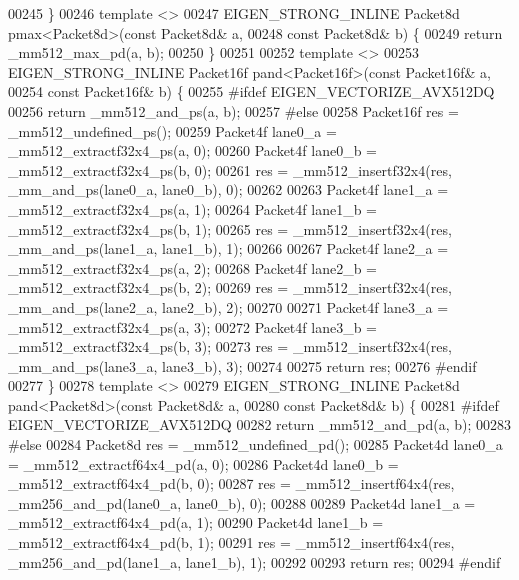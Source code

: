 \begin{DoxyCode}
00245 \}
00246 \textcolor{keyword}{template} <>
00247 EIGEN\_STRONG\_INLINE Packet8d pmax<Packet8d>(\textcolor{keyword}{const} Packet8d& a,
00248                                             \textcolor{keyword}{const} Packet8d& b) \{
00249   \textcolor{keywordflow}{return} \_mm512\_max\_pd(a, b);
00250 \}
00251 
00252 \textcolor{keyword}{template} <>
00253 EIGEN\_STRONG\_INLINE Packet16f pand<Packet16f>(\textcolor{keyword}{const} Packet16f& a,
00254                                               \textcolor{keyword}{const} Packet16f& b) \{
00255 \textcolor{preprocessor}{#ifdef EIGEN\_VECTORIZE\_AVX512DQ}
00256   \textcolor{keywordflow}{return} \_mm512\_and\_ps(a, b);
00257 \textcolor{preprocessor}{#else}
00258   Packet16f res = \_mm512\_undefined\_ps();
00259   Packet4f lane0\_a = \_mm512\_extractf32x4\_ps(a, 0);
00260   Packet4f lane0\_b = \_mm512\_extractf32x4\_ps(b, 0);
00261   res = \_mm512\_insertf32x4(res, \_mm\_and\_ps(lane0\_a, lane0\_b), 0);
00262 
00263   Packet4f lane1\_a = \_mm512\_extractf32x4\_ps(a, 1);
00264   Packet4f lane1\_b = \_mm512\_extractf32x4\_ps(b, 1);
00265   res = \_mm512\_insertf32x4(res, \_mm\_and\_ps(lane1\_a, lane1\_b), 1);
00266 
00267   Packet4f lane2\_a = \_mm512\_extractf32x4\_ps(a, 2);
00268   Packet4f lane2\_b = \_mm512\_extractf32x4\_ps(b, 2);
00269   res = \_mm512\_insertf32x4(res, \_mm\_and\_ps(lane2\_a, lane2\_b), 2);
00270 
00271   Packet4f lane3\_a = \_mm512\_extractf32x4\_ps(a, 3);
00272   Packet4f lane3\_b = \_mm512\_extractf32x4\_ps(b, 3);
00273   res = \_mm512\_insertf32x4(res, \_mm\_and\_ps(lane3\_a, lane3\_b), 3);
00274 
00275   \textcolor{keywordflow}{return} res;
00276 \textcolor{preprocessor}{#endif}
00277 \}
00278 \textcolor{keyword}{template} <>
00279 EIGEN\_STRONG\_INLINE Packet8d pand<Packet8d>(\textcolor{keyword}{const} Packet8d& a,
00280                                             \textcolor{keyword}{const} Packet8d& b) \{
00281 \textcolor{preprocessor}{#ifdef EIGEN\_VECTORIZE\_AVX512DQ}
00282   \textcolor{keywordflow}{return} \_mm512\_and\_pd(a, b);
00283 \textcolor{preprocessor}{#else}
00284   Packet8d res = \_mm512\_undefined\_pd();
00285   Packet4d lane0\_a = \_mm512\_extractf64x4\_pd(a, 0);
00286   Packet4d lane0\_b = \_mm512\_extractf64x4\_pd(b, 0);
00287   res = \_mm512\_insertf64x4(res, \_mm256\_and\_pd(lane0\_a, lane0\_b), 0);
00288 
00289   Packet4d lane1\_a = \_mm512\_extractf64x4\_pd(a, 1);
00290   Packet4d lane1\_b = \_mm512\_extractf64x4\_pd(b, 1);
00291   res = \_mm512\_insertf64x4(res, \_mm256\_and\_pd(lane1\_a, lane1\_b), 1);
00292 
00293   \textcolor{keywordflow}{return} res;
00294 \textcolor{preprocessor}{#endif}

\end{DoxyCode}

